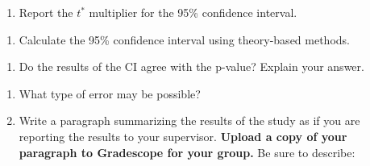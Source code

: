 \documentclass[
]{report}
\providecommand{\tightlist}{%
  \setlength{\itemsep}{0pt}\setlength{\parskip}{0pt}}
\begin{document}
\begin{enumerate}
\def\labelenumi{\arabic{enumi}.}
\setcounter{enumi}{12}
\tightlist
\item
  Report the \(t^*\) multiplier for the 95\% confidence interval.
\end{enumerate}

\vspace{0.3in}

\begin{enumerate}
\def\labelenumi{\arabic{enumi}.}
\setcounter{enumi}{13}
\tightlist
\item
  Calculate the 95\% confidence interval using theory-based methods.
\end{enumerate}

\vspace{0.5in}

\begin{enumerate}
\def\labelenumi{\arabic{enumi}.}
\setcounter{enumi}{14}
\tightlist
\item
  Do the results of the CI agree with the p-value? Explain your answer.
\end{enumerate}

\vspace{0.5in}

\begin{enumerate}
\def\labelenumi{\arabic{enumi}.}
\setcounter{enumi}{15}
\item
  What type of error may be possible?
  \vspace{0.2in}
\item
  Write a paragraph summarizing the results of the study as if you are reporting the results to your supervisor. \textbf{Upload a copy of your paragraph to Gradescope for your group.} Be sure to describe:
\end{enumerate}
\end{document}

